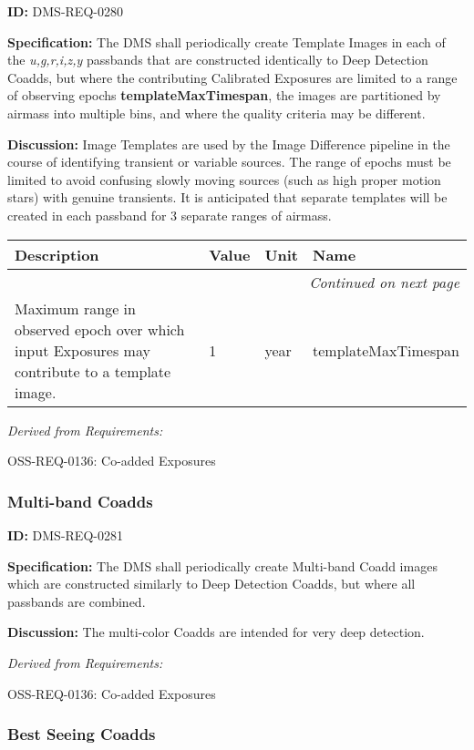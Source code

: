 \documentclass[SE,toc,lsstdraft]{lsstdoc}
\makeatletter
\newcommand{\paramname}[1]{\hspace{0pt}#1}
\newcommand{\unitname}[1]{\hspace{0pt}#1}
\newenvironment{parameters}[0]{%
\setlength\LTleft{0pt}
\setlength\LTright{\fill}
\begin{small}
\begin{longtable}[]{|p{0.5\textwidth}|l|p{0.6in}|p{1.74in}@{}|}

\hline \textbf{Description} & \textbf{Value} & \textbf{Unit} & \textbf{Name} \\ \hline
\endhead

\hline \multicolumn{4}{r}{\emph{Continued on next page}} \\
\endfoot

\hline\hline
\endlastfoot
}{%
\hline
\end{longtable}
\end{small}
}
\makeatother
\begin{document}
\label{DMS-REQ-0280}
\textbf{ID:} DMS-REQ-0280

\textbf{Specification:} The DMS shall periodically create Template Images in each of the \textit{u,g,r,i,z,y} passbands that are constructed identically to Deep Detection Coadds, but where the contributing Calibrated Exposures are limited to a range of observing epochs \textbf{templateMaxTimespan}, the images are partitioned by airmass into multiple bins, and where the quality criteria may be different.

\textbf{Discussion: }Image Templates are used by the Image Difference pipeline in the course of identifying transient or variable sources. The range of epochs must be limited to avoid confusing slowly moving sources (such as high proper motion stars) with genuine transients. It is anticipated that separate templates will be created in each passband for 3 separate ranges of airmass.



\begin{parameters}
Maximum range in observed epoch over which input Exposures may contribute to a template image.
&
1
&
\unitname{%
year
}
&
\paramname{%
templateMaxTimespan
} \\\hline
\end{parameters}




\emph{Derived from Requirements:}

OSS-REQ-0136:
Co-added Exposures \newline


\subsubsection{Multi-band Coadds}

\label{DMS-REQ-0281}
\textbf{ID:} DMS-REQ-0281

\textbf{Specification:} The DMS shall periodically create Multi-band Coadd images which are constructed similarly to Deep Detection Coadds, but where all passbands are combined.

\textbf{Discussion: }The multi-color Coadds are intended for very deep detection.




\emph{Derived from Requirements:}

OSS-REQ-0136:
Co-added Exposures \newline


\subsubsection{Best Seeing Coadds}
\end{document}
